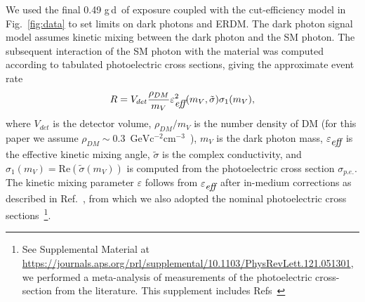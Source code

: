 \documentclass[%
reprint,
superscriptaddress,
preprintnumbers,
amsmath,amssymb,
prl,
aps,
floatfix
]{revtex4-1}
\newcommand{\gd}{g\,d}
\begin{document}
We used the final 0.49 \gd\ of exposure coupled with the cut-efficiency model in Fig.~\ref{fig:data} to set limits on dark photons and ERDM. The dark photon signal model assumes kinetic mixing between the dark photon and the SM photon. The subsequent interaction of the SM photon with the material was computed according to tabulated photoelectric cross sections, giving the approximate event rate~\cite{Hochberg}
\begin{equation}
R = V_{det}\frac{\rho_{DM}}{m_{V}}\varepsilon_{\mbox{\it eff}}^2(m_V,\tilde{\sigma})\sigma_1(m_{V}), 
\end{equation}
where $V_{det}$ is the detector volume, $\rho_{DM}/m_{V}$ is the number density of DM (for this paper we assume $\rho_{DM}\sim0.3$~$\mathrm{GeV c^{-2} cm^{-3}}$~\cite{Read}), $m_{V}$ is the dark photon mass, $\varepsilon_{\mbox{\it eff}}$ is the effective kinetic mixing angle, $\tilde{\sigma}$ is the complex conductivity, and $\sigma_1(m_{V})=\mathrm{Re}(\tilde{\sigma}(m_{V}))$ is computed from the photoelectric cross section $\sigma_{p.e.}$. The kinetic mixing parameter $\varepsilon$ follows from $\varepsilon_{\mbox{\it eff}}$ after in-medium corrections as described in Ref.~\cite{Hochberg}, from which we also adopted the nominal photoelectric cross sections~\footnote{See Supplemental Material at \url{https://journals.aps.org/prl/supplemental/10.1103/PhysRevLett.121.051301}, we performed a meta-analysis of measurements of the photoelectric cross-section from the literature. This supplement includes Refs~\cite{HENKE1993181,Edwards1997547,Green,PhysRev.111.1245,Dash,Holland,Henke88,PhysRevB.49.16283,PhysRevB.2.1918,PhysRevA.37.4978,opticalprocesses,ashcroft1976solid,PhysRev.139.A560}}. 
\end{document}
